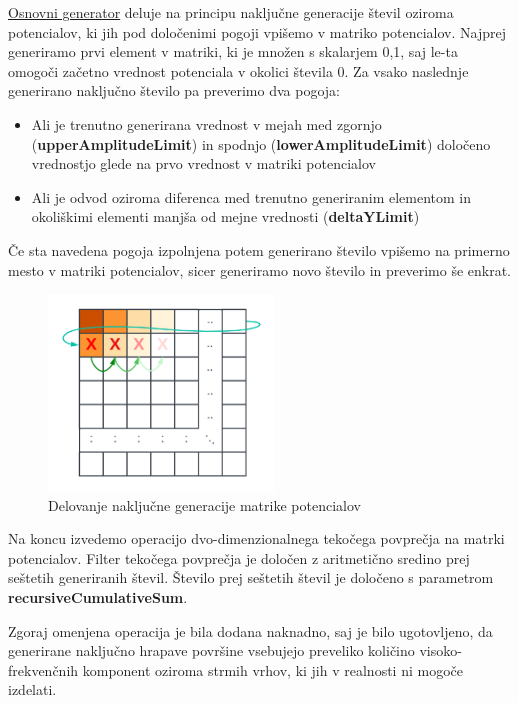 \documentclass[a4paper,twoside,openright,12pt,slovene]{book}
\begin{document}
\hyperref[fig:osnovniGenerator]{Osnovni generator} deluje na principu naključne generacije števil oziroma potencialov, ki jih pod določenimi pogoji vpišemo v matriko potencialov. Najprej generiramo prvi element v matriki, ki je množen s skalarjem 0,1, saj le-ta omogoči začetno vrednost potenciala v okolici števila 0. Za vsako naslednje generirano naključno število pa preverimo dva pogoja: 

\begin{itemize}
    \setlength\itemsep{0.1em}
    \item Ali je trenutno generirana vrednost v mejah med zgornjo (\textbf{upperAmplitudeLimit}) in spodnjo (\textbf{lowerAmplitudeLimit}) določeno vrednostjo glede na prvo vrednost v matriki potencialov
    \item Ali je odvod oziroma diferenca med trenutno generiranim elementom in okoliškimi elementi manjša od mejne vrednosti (\textbf{deltaYLimit})
\end{itemize}

Če sta navedena pogoja izpolnjena potem generirano število vpišemo na primerno mesto v matriki potencialov, sicer generiramo novo število in preverimo še enkrat.

\begin{figure}[H]
    \centering
    \includegraphics[width=60mm]{Slike/Osnovni generator.png}
    \caption{Delovanje naključne generacije matrike potencialov}
    \label{fig:osnovniGenerator}
\end{figure}

Na koncu izvedemo operacijo dvo-dimenzionalnega tekočega povprečja na matrki potencialov. Filter tekočega povprečja je določen z aritmetično sredino prej seštetih generiranih števil. Število prej seštetih števil je določeno s parametrom \textbf{recursiveCumulativeSum}.

Zgoraj omenjena operacija je bila dodana naknadno, saj je bilo ugotovljeno, da generirane naključno hrapave površine vsebujejo preveliko količino visoko-frekvenčnih komponent oziroma strmih vrhov, ki jih v realnosti ni mogoče izdelati.
\end{document}
